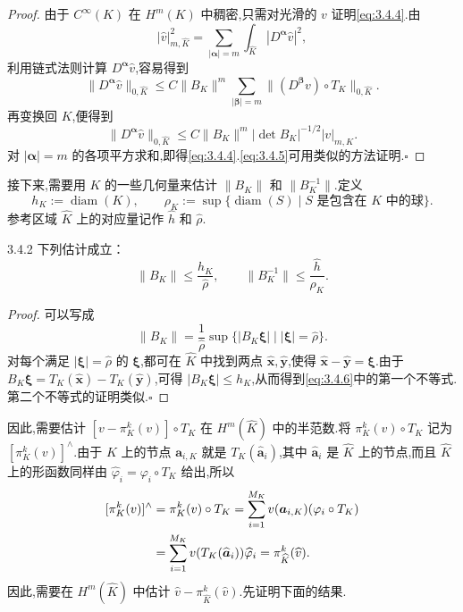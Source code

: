 \begin{proof}
由于 \(C^\infty(K)\) 在 \(H^m(K)\) 中稠密,只需对光滑的 \(v\) 证明\eqref{eq:3.4.4}.由
\[
  |\widehat v|_{m,\widehat K}^2
    =\sum_{|\boldsymbol{\alpha}|=m}\int_{\widehat K}|D^{\boldsymbol{\alpha}}\widehat v|^2,
\]
利用链式法则计算 \(D^{\boldsymbol{\alpha}}\widehat v\),容易得到
\[
  \|D^{\boldsymbol{\alpha}}\widehat v\|_{0,\widehat K}
  \le C\|B_K\|^m\sum_{|\boldsymbol{\beta}|=m}
      \|(D^{\boldsymbol{\beta}}v)\circ T_K\|_{0,\widehat K}.
\]
再变换回 \(K\),便得到
\[
  \|D^{\boldsymbol{\alpha}}\widehat v\|_{0,\widehat K}
  \le C\|B_K\|^m|\det B_K|^{-1/2}|v|_{m,K}.
\]
对 \(|\boldsymbol{\alpha}|=m\) 的各项平方求和,即得\eqref{eq:3.4.4}.\eqref{eq:3.4.5}可用类似的方法证明.\hfill\(\square\)
\end{proof}

接下来,需要用 \(K\) 的一些几何量来估计 \(\|B_K\|\) 和 \(\|B_K^{-1}\|\).定义
\[
  h_K:=\operatorname{diam}(K),\qquad
  \rho_K:=\sup\{\operatorname{diam}(S)\mid S\text{ 是包含在 \(K\) 中的球}\}.
\]
参考区域 \(\widehat K\) 上的对应量记作 \(\widehat h\) 和 \(\widehat\rho\).

\begin{proposition}[]{3.4.2}
下列估计成立：
\begin{equation}\label{eq:3.4.6}
  \|B_K\|\le\frac{h_K}{\widehat\rho},\qquad
  \|B_K^{-1}\|\le\frac{\widehat h}{\rho_K}.
\end{equation}
\end{proposition}

\begin{proof}
可以写成
\[
  \|B_K\|=\frac1{\widehat\rho}
  \sup\{|B_K\boldsymbol{\xi}|\mid|\boldsymbol{\xi}|=\widehat\rho\}.
\]
对每个满足 \(|\boldsymbol{\xi}|=\widehat\rho\) 的 \(\boldsymbol{\xi}\),都可在 \(\widehat K\) 中找到两点 \(\widehat{\boldsymbol{x}},\widehat{\boldsymbol{y}}\),使得 \(\widehat{\boldsymbol{x}}-\widehat{\boldsymbol{y}}=\boldsymbol{\xi}\).由于 \(B_K\boldsymbol{\xi}=T_K(\widehat{\boldsymbol{x}})-T_K(\widehat{\boldsymbol{y}})\),可得 \(|B_K\boldsymbol{\xi}|\le h_K\),从而得到\eqref{eq:3.4.6}中的第一个不等式.第二个不等式的证明类似.\hfill\(\square\)
\end{proof}

因此,需要估计 \([v-\pi_K^k(v)]\circ T_K\) 在 \(H^m(\widehat K)\) 中的半范数.将 \(\pi_K^k(v)\circ T_K\) 记为 \([\pi_K^k(v)]^\wedge\).由于 \(K\) 上的节点 \(\boldsymbol{a}_{i,K}\) 就是 \(T_K(\widehat{\boldsymbol{a}}_i)\),其中 \(\widehat{\boldsymbol{a}}_i\) 是 \(\widehat K\) 上的节点,而且 \(\widehat K\) 上的形函数同样由 \(\widehat\varphi_i=\varphi_i\circ T_K\) 给出,所以
\begin{equation}\label{eq:3.4.7}
  \begin{aligned}
    \relax[\pi_K^k(v)]^\wedge&=\pi_K^k(v)\circ T_K
       =\sum_{i=1}^{M_K}v(\boldsymbol{a}_{i,K})(\varphi_i\circ T_K)\\
    &=\sum_{i=1}^{M_K}v(T_K(\widehat{\boldsymbol{a}}_i))\widehat\varphi_i
       =\pi_{\widehat K}^k(\widehat v).
  \end{aligned}
\end{equation}
因此,需要在 \(H^m(\widehat K)\) 中估计 \(\widehat v-\pi_{\widehat K}^k(\widehat v)\).先证明下面的结果.

